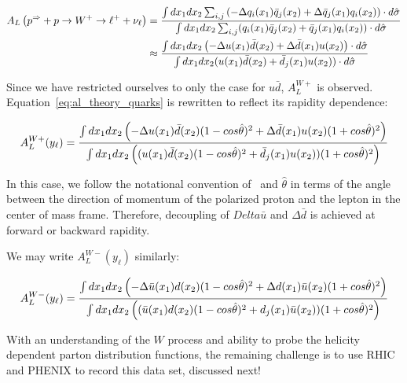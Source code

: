 \begin{align}\label{eq:al_theory_quarks}
  {
    A_L
    \left(
      p^{\Rightarrow}+p\rightarrow W^+ \rightarrow \ell^+ +\nu_{\ell}
    \right)
  } &=  
  {
    {
      \int dx_1 dx_2 \sum_{i,j}
      \left(
        -\Delta q_i(x_1)\bar{q}_j(x_2)
        +\Delta \bar{q}_j(x_1)q_i(x_2)
      \right)\cdot d \hat{\sigma}
    }
    \over
    {
      \int dx_1 dx_2
      \sum_{i,j}(q_i(x_1)\bar{q}_j(x_2)+\bar{q}_j(x_1)q_i(x_2))\cdot d\hat{\sigma}
    }
 }\\
 & \approx  \nonumber
 {
   {
      \int dx_1 dx_2 
      \left(
        -\Delta u(x_1)\bar{d}(x_2)
        +\Delta \bar{d}(x_1)u(x_2)
      \right)\cdot d \hat{\sigma}
   }
   \over
   {
      \int dx_1 dx_2 (u(x_1)\bar{d}(x_2)+\bar{d}_j(x_1)u(x_2))\cdot d\hat{\sigma}
   }
 }
\end{align}

{\noindent}Since we have restricted ourselves to only the case for $u\bar{d}$,
$A_L^{W+}$ is observed. Equation~\ref{eq:al_theory_quarks} is rewritten to
reflect its rapidity dependence:

\begin{equation}
  {A_L^{W+}(y_{\ell})} = 
  {
    {
     \int dx_1 dx_2 
     \left(
       -\Delta u(x_1)\bar{d}(x_2)(1-cos\hat{\theta})^2
       +\Delta \bar{d}(x_1)u(x_2)(1+cos\hat{\theta})^2
     \right)
    }
    \over
    {
       \int dx_1 dx_2 
       \left(
       (u(x_1)\bar{d}(x_2)   (1-cos\hat{\theta})^2
      +\bar{d}_j(x_1)u(x_2)) (1+cos\hat{\theta})^2
        \right)
    }
  }
  \label{eq:al_w_pos_rapidity_dependance}
\end{equation}

\clearpage

{\noindent}In this case, we follow the notational convention of~\cite{Oide2012}
and $\hat{\theta}$ in terms of the angle between the direction of momentum of
the polarized proton and the lepton in the center of mass frame. Therefore,
decoupling of $Delta\bar{u}$ and $\Delta\bar{d}$ is achieved at forward or
backward rapidity.

{\noindent}We may write $A_L^{W-}(y_{\ell})$ similarly:

\begin{equation}
  {A_L^{W-}(y_{\ell})} = 
  {
    {
     \int dx_1 dx_2 
     \left(
       -\Delta \bar{u}(x_1)d(x_2)(1-cos\hat{\theta})^2
       +\Delta d(x_1)\bar{u}(x_2)(1+cos\hat{\theta})^2
     \right)
    }
    \over
    {
       \int dx_1 dx_2 
       \left(
         (\bar{u}(x_1)d(x_2)   (1-cos\hat{\theta})^2
         +d_j(x_1)\bar{u}(x_2)) (1+cos\hat{\theta})^2
        \right)
    }
  }
  \label{eq:al_w_neg_rapidity_dependance}
\end{equation}

With an understanding of the $W$ process and ability to probe the helicity
dependent parton distribution functions, the remaining challenge is to use RHIC
and PHENIX to record this data set, discussed next!
